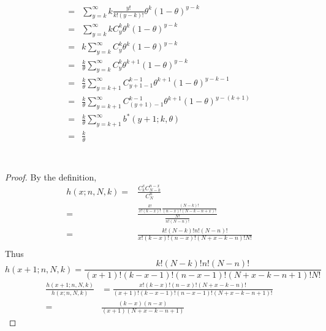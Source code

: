 \documentclass{article}
\begin{document}
{\begin{equation*}
\begin{split}
                    =&\sum_{y=k}^\infty k\frac{y!}{k!(y-k)!}\theta^k(1-\theta)^{y-k}\\
                    =&\sum_{y=k}^\infty kC_y^k\theta^k(1-\theta)^{y-k}\\
                    =&k\sum_{y=k}^\infty C_y^k\theta^k(1-\theta)^{y-k}\\
                    =&\frac{k}{\theta}\sum_{y=k}^\infty C_y^k\theta^{k+1}(1-\theta)^{y-k}\\
                    =&\frac{k}{\theta}\sum_{y=k+1}^\infty C_{y+1-1}^{k-1}\theta^{k+1}(1-\theta)^{y-k-1}\\
                    =&\frac{k}{\theta}\sum_{y=k+1}^\infty C_{(y+1)-1}^{k-1}\theta^{k+1}(1-\theta)^{y-(k+1)}\\
                    =&\frac{k}{\theta}\sum_{y=k+1}^\infty b^*(y+1;k,\theta)\\
                    =&\frac{k}{\theta}\\
            \end{split}
        \end{equation*}
    }

    \section{}
        \begin{proof}
            By the definition,
            \begin{equation*}
                \begin{split}
                    h(x;n,N,k)=&\frac{C_k^xC_{N-k}^{n-x}}{C_N^n}\\
                        =&\frac{\frac{k!}{x!(k-x)!}\frac{(N-k)!}{(n-x)!(N-k-n+x)!}}{\frac{N!}{n!(N-n)!}}\\
                        =&\frac{k!(N-k)!n!(N-n)!}{x!(k-x)!(n-x)!(N+x-k-n)!N!}\\
                \end{split}
            \end{equation*}
            Thus
            $$h(x+1;n,N,k)=\frac{k!(N-k)!n!(N-n)!}{(x+1)!(k-x-1)!(n-x-1)!(N+x-k-n+1)!N!}$$
            \begin{equation*}
                \begin{split}
                    \frac{h(x+1;n,N,k)}{h(x;n,N,k)}&=\frac{x!(k-x)!(n-x)!(N+x-k-n)!}{(x+1)!(k-x-1)!(n-x-1)!(N+x-k-n+1)!}\\
                        =&\frac{(k-x)(n-x)}{(x+1)(N+x-k-n+1)}
                \end{split}
            \end{equation*}
        \end{proof}
\end{document}
